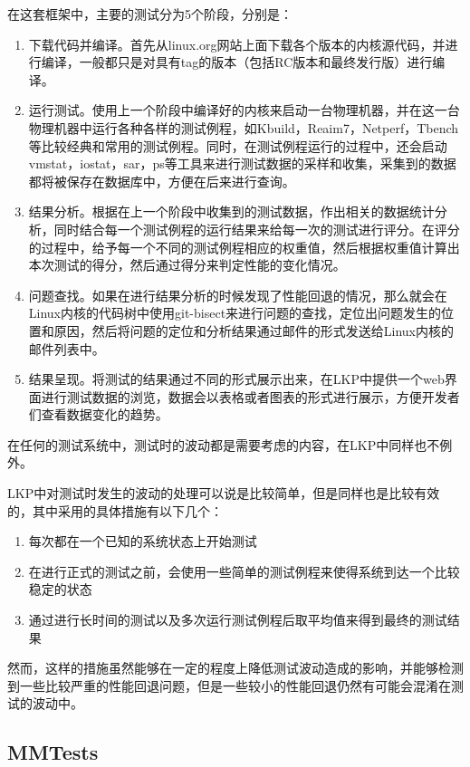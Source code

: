 在这套框架中，主要的测试分为5个阶段，分别是：
\begin{enumerate}
\item 下载代码并编译。首先从linux.org网站上面下载各个版本的内核源代码，并进行编译，一般都只是对具有tag的版本（包括RC版本和最终发行版）进行编译。
\item 运行测试。使用上一个阶段中编译好的内核来启动一台物理机器，并在这一台物理机器中运行各种各样的测试例程，如Kbuild，Reaim7，Netperf，Tbench等比较经典和常用的测试例程。同时，在测试例程运行的过程中，还会启动vmstat，iostat，sar，ps等工具来进行测试数据的采样和收集，采集到的数据都将被保存在数据库中，方便在后来进行查询。
\item 结果分析。根据在上一个阶段中收集到的测试数据，作出相关的数据统计分析，同时结合每一个测试例程的运行结果来给每一次的测试进行评分。在评分的过程中，给予每一个不同的测试例程相应的权重值，然后根据权重值计算出本次测试的得分，然后通过得分来判定性能的变化情况。
\item 问题查找。如果在进行结果分析的时候发现了性能回退的情况，那么就会在Linux内核的代码树中使用git-bisect来进行问题的查找，定位出问题发生的位置和原因，然后将问题的定位和分析结果通过邮件的形式发送给Linux内核的邮件列表中。
\item 结果呈现。将测试的结果通过不同的形式展示出来，在LKP中提供一个web界面进行测试数据的浏览，数据会以表格或者图表的形式进行展示，方便开发者们查看数据变化的趋势。
\end{enumerate}

在任何的测试系统中，测试时的波动都是需要考虑的内容，在LKP中同样也不例外。

LKP中对测试时发生的波动的处理可以说是比较简单，但是同样也是比较有效的，其中采用的具体措施有以下几个：
\begin{enumerate}
\item 每次都在一个已知的系统状态上开始测试
\item 在进行正式的测试之前，会使用一些简单的测试例程来使得系统到达一个比较稳定的状态
\item 通过进行长时间的测试以及多次运行测试例程后取平均值来得到最终的测试结果
\end{enumerate}

然而，这样的措施虽然能够在一定的程度上降低测试波动造成的影响，并能够检测到一些比较严重的性能回退问题，但是一些较小的性能回退仍然有可能会混淆在测试的波动中。

\subsection{MMTests}

